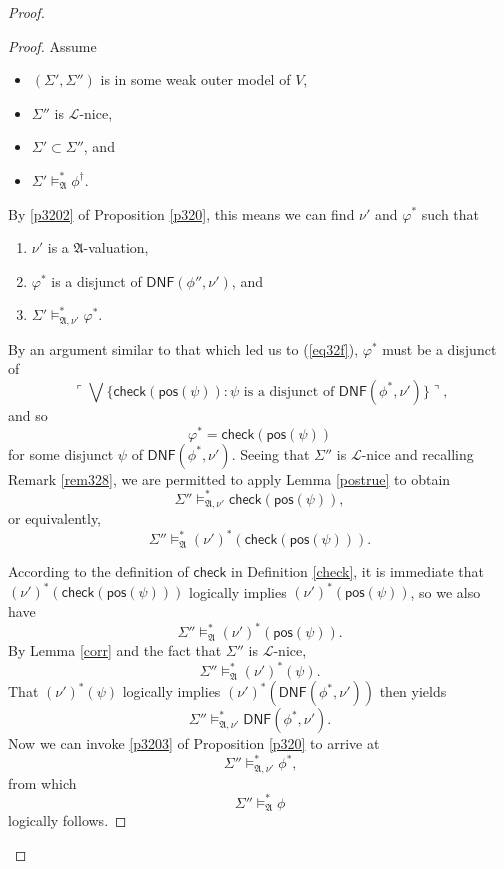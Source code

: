 \documentclass[12pt]{article}
\numberwithin{equation}{section}
\begin{document}
\begin{proof}
\begin{enumerate}[label=Case \arabic*:, leftmargin=50pt]
    \begin{proof}
    Assume 
    \begin{itemize}
        \item $(\Sigma', \Sigma'')$ is in some weak outer model of $V$,
        \item $\Sigma''$ is $\mathcal{L}$-nice,
        \item $\Sigma' \subset \Sigma''$, and 
        \item $\Sigma' \models^{*}_{\mathfrak{A}} \phi^{\dagger}$.
    \end{itemize} 
    By \ref{p3202} of Proposition \ref{p320}, this means we can find $\nu'$ and $\varphi^*$ such that
    \begin{enumerate}[label=(\alph*)]
        \item $\nu'$ is a $\mathfrak{A}$-valuation, 
        \item $\varphi^*$ is a disjunct of $\mathsf{DNF}(\phi'', \nu')$, and
        \item $\Sigma' \models^{*}_{\mathfrak{A}, \nu'} \varphi^*$.
    \end{enumerate}
    By an argument similar to that which led us to (\ref{eq32f}), $\varphi^*$ must be a disjunct of 
    \begin{equation*}
        \ulcorner \bigvee \{\mathsf{check}(\mathsf{pos}(\psi)) : \psi \text{ is a disjunct of } \mathsf{DNF}(\phi^*, \nu')\} \urcorner \text{,}
    \end{equation*}
    and so 
    \begin{equation*}
        \varphi^* = \mathsf{check}(\mathsf{pos}(\psi))
    \end{equation*}
    for some disjunct $\psi$ of $\mathsf{DNF}(\phi^*, \nu')$. Seeing that $\Sigma''$ is $\mathcal{L}$-nice and recalling Remark \ref{rem328}, we are permitted to apply Lemma \ref{postrue} to obtain $$\Sigma'' \models^{*}_{\mathfrak{A}, \nu'} \mathsf{check}(\mathsf{pos}(\psi)),$$ or equivalently, $$\Sigma'' \models^{*}_{\mathfrak{A}} (\nu')^*(\mathsf{check}(\mathsf{pos}(\psi))).$$
    
    According to the definition of $\mathsf{check}$ in Definition \ref{check}, it is immediate that $(\nu')^*(\mathsf{check}(\mathsf{pos}(\psi)))$ logically implies $(\nu')^*(\mathsf{pos}(\psi))$, so we also have $$\Sigma'' \models^{*}_{\mathfrak{A}} (\nu')^*(\mathsf{pos}(\psi)).$$ By Lemma \ref{corr} and the fact that $\Sigma''$ is $\mathcal{L}$-nice, $$\Sigma'' \models^{*}_{\mathfrak{A}} (\nu')^*(\psi).$$ That $(\nu')^*(\psi)$ logically implies $(\nu')^*(\mathsf{DNF}(\phi^*, \nu'))$ then yields $$\Sigma'' \models^{*}_{\mathfrak{A}, \nu'} \mathsf{DNF}(\phi^*, \nu').$$ Now we can invoke \ref{p3203} of Proposition \ref{p320} to arrive at 
    \begin{equation*}
        \Sigma'' \models^{*}_{\mathfrak{A}, \nu'} \phi^* \text{,}
    \end{equation*}
    from which 
    \begin{equation*}
        \Sigma'' \models^{*}_{\mathfrak{A}} \phi
    \end{equation*}
    logically follows.
    \end{proof}


\end{enumerate}
\end{proof}
\end{document}
